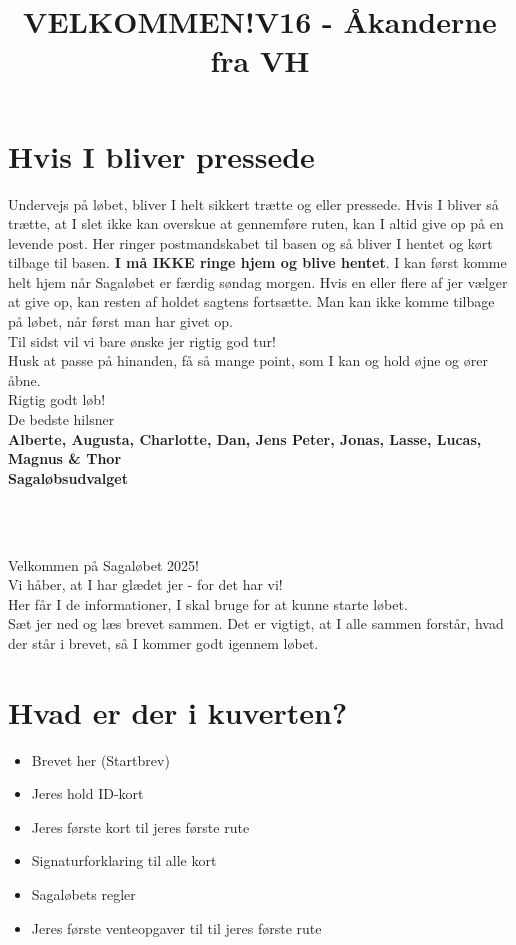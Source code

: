 \section{Hvis I bliver pressede}
Undervejs på løbet, bliver I helt sikkert trætte og eller pressede. Hvis I bliver så trætte, at I slet ikke kan overskue at gennemføre ruten, kan I altid give op på en levende post. Her ringer postmandskabet til basen og så bliver I hentet og kørt tilbage til basen. \textbf{I må IKKE ringe hjem og blive hentet}. I kan først komme helt hjem når Sagaløbet er færdig søndag morgen. Hvis en eller flere af jer vælger at give op, kan resten af holdet sagtens fortsætte. Man kan ikke komme tilbage på løbet, når først man har givet op.\\
\newline
Til sidst vil vi bare ønske jer rigtig god tur!\\
Husk at passe på hinanden, få så mange point, som I kan og hold øjne og ører åbne.\\
\newline
Rigtig godt løb!\\
\newline
\textcolor{søblå}{De bedste hilsner}\\
\textcolor{natblå}{\textbf{Alberte, Augusta, Charlotte, Dan, Jens Peter, Jonas, Lasse, Lucas, Magnus \& Thor}}\\
\textcolor{natblå}{\textbf{Sagaløbsudvalget}}\\
\newpage
\title{VELKOMMEN!}\\
\newline
\title{\textcolor{søblå}{V16 - Åkanderne fra VH }}\\
\newline
Velkommen på Sagaløbet 2025!\\
Vi håber, at I har glædet jer - for det har vi!\\
Her får I de informationer, I skal bruge for at kunne starte løbet.\\
Sæt jer ned og læs brevet sammen. Det er vigtigt, at I alle sammen forstår, hvad der står i brevet, så I kommer godt igennem løbet.
\section{Hvad er der i kuverten?}
\begin{itemize}
    \item Brevet her (Startbrev)
    \item Jeres hold ID-kort
    \item Jeres første kort til jeres første rute
    \item Signaturforklaring til alle kort
    \item Sagaløbets regler
    \item Jeres første venteopgaver til til jeres første rute
\end{itemize}
